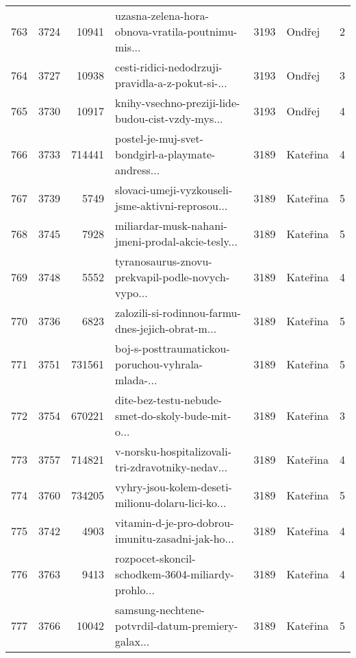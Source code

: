 \begin{tabular}{lrrlrlr}
763  &       3724 &    10941 &  uzasna-zelena-hora-obnova-vratila-poutnimu-mis... &     3193 &                       Ondřej &               2 \\
764  &       3727 &    10938 &  cesti-ridici-nedodrzuji-pravidla-a-z-pokut-si-... &     3193 &                       Ondřej &               3 \\
765  &       3730 &    10917 &  knihy-vsechno-preziji-lide-budou-cist-vzdy-mys... &     3193 &                       Ondřej &               4 \\
766  &       3733 &   714441 &  postel-je-muj-svet-bondgirl-a-playmate-andress... &     3189 &                     Kateřina &               4 \\
767  &       3739 &     5749 &  slovaci-umeji-vyzkouseli-jsme-aktivni-reprosou... &     3189 &                     Kateřina &               5 \\
768  &       3745 &     7928 &  miliardar-musk-nahani-jmeni-prodal-akcie-tesly... &     3189 &                     Kateřina &               5 \\
769  &       3748 &     5552 &  tyranosaurus-znovu-prekvapil-podle-novych-vypo... &     3189 &                     Kateřina &               4 \\
770  &       3736 &     6823 &  zalozili-si-rodinnou-farmu-dnes-jejich-obrat-m... &     3189 &                     Kateřina &               5 \\
771  &       3751 &   731561 &  boj-s-posttraumatickou-poruchou-vyhrala-mlada-... &     3189 &                     Kateřina &               5 \\
772  &       3754 &   670221 &  dite-bez-testu-nebude-smet-do-skoly-bude-mit-o... &     3189 &                     Kateřina &               3 \\
773  &       3757 &   714821 &  v-norsku-hospitalizovali-tri-zdravotniky-nedav... &     3189 &                     Kateřina &               4 \\
774  &       3760 &   734205 &  vyhry-jsou-kolem-deseti-milionu-dolaru-lici-ko... &     3189 &                     Kateřina &               5 \\
775  &       3742 &     4903 &  vitamin-d-je-pro-dobrou-imunitu-zasadni-jak-ho... &     3189 &                     Kateřina &               4 \\
776  &       3763 &     9413 &  rozpocet-skoncil-schodkem-3604-miliardy-prohlo... &     3189 &                     Kateřina &               4 \\
777  &       3766 &    10042 &  samsung-nechtene-potvrdil-datum-premiery-galax... &     3189 &                     Kateřina &               5 \\

\end{tabular}
